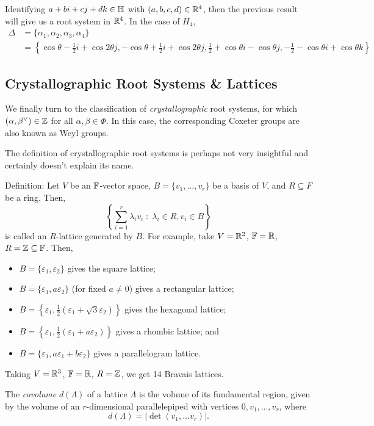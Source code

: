Identifying $a+bi+cj+dk \in \mathbb{H}$ with $(a,b,c,d) \in \mathbb{R}^4$, then the previous
result will give us a root system in $\mathbb{R}^4$. In the case of $H_4$,
\begin{align*} %
    \Delta &= \{\alpha_1, \alpha_2, \alpha_3, \alpha_4\} \\
    &= \left\{
        \cos \theta - \frac{1}{2} i + \cos 2\theta j,
        -\cos \theta + \frac{1}{2} i + \cos 2\theta j,
        \frac{1}{2} + \cos \theta i - \cos \theta j,
        -\frac{1}{2} - \cos \theta i + \cos \theta k
    \right\}
\end{align*}

\subsection{Crystallographic Root Systems \& Lattices}

We finally turn to the classification of {\em crystallographic} root systems,
for which $(\alpha, \beta^\vee) \in \mathbb{Z}$ for all $\alpha, \beta \in \Phi$.
In this case, the corresponding Coxeter groups are also known as Weyl groups.

The definition of crystallographic root systems is perhaps not very insightful
and certainly doesn't explain its name.

Definition: Let $V$ be an $\mathbb{F}$-vector space, $B = \{v_1, \dots, v_r\}$ be a
basis of $V$, and $R \subseteq F$ be a ring. Then,
\[
    \left\{ \sum_{i=1}^{r} \lambda_i v_i \; : \; \lambda_i \in R, v_i \in B\right\}
\]
is called an $R$-lattice generated by $B$.
For example, take $V = \mathbb{R}^2$, $\mathbb{F} = \mathbb{R}$, $R = \mathbb{Z} \subseteq \mathbb{F}$. Then,
\begin{itemize}
\item
$B = \{\varepsilon_1, \varepsilon_2\}$ gives the square lattice;
\item
$B = \{\varepsilon_1, a\varepsilon_2\}$ (for fixed $a \neq 0$) gives a
rectangular lattice;
\item
$B = \left\{\varepsilon_1, \frac{1}{2}(\varepsilon_1 + \sqrt{3} \varepsilon_2)\right\}$
gives the hexagonal lattice;
\item
$B = \left\{\varepsilon_1, \frac{1}{2} (\varepsilon_1 + a\varepsilon_2) \right\}$
gives a rhombic lattice; and
\item
$B = \{\varepsilon_1, a\varepsilon_1 + b\varepsilon_2\}$
gives a parallelogram lattice.
\end{itemize}
Taking $V = \mathbb{R}^3$, $\mathbb{F} = \mathbb{R}$, $R = \mathbb{Z}$, we get 14 Bravais lattices.

The {\em covolume} $d(\Lambda)$ of a lattice $\Lambda$ is the volume of its
fundamental region, given by the volume of an $r$-dimensional parallelepiped
with vertices $0, v_1, \dots, v_r$, where
\[
    d(\Lambda) = |\det (v_1, \dots v_r)|.
\]

